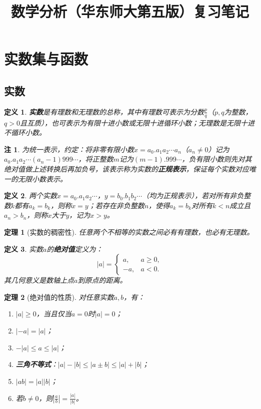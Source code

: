 \documentclass[11pt, a4paper, openany]{article}
\newtheorem{definition}{定义}[section]
\newtheorem{theorem}{定理}[section]
\newtheorem{remark}{注}[section]
\begin{document}
\title{数学分析（华东师大第五版）复习笔记}
\maketitle

\section{实数集与函数}
\subsection{实数}
\begin{definition}
\textbf{实数}是有理数和无理数的总称，其中有理数可表示为分数$\frac{p}{q}$（$p,q$为整数，$q>0$且互质），也可表示为有限十进小数或无限十进循环小数；无理数是无限十进不循环小数。
\end{definition}

\begin{remark}
为统一表示，约定：将非零有限小数$x=a_0.a_1a_2\cdots a_n$（$a_n\neq0$）记为$a_0.a_1a_2\cdots(a_n-1)999\cdots$，将正整数$m$记为$(m-1).999\cdots$，负有限小数则先对其绝对值做上述转换后再加负号，该表示称为实数的\textbf{正规表示}，保证每个实数对应唯一的无限小数表示。
\end{remark}

\begin{definition}
两个实数$x=a_0.a_1a_2\cdots$，$y=b_0.b_1b_2\cdots$（均为正规表示），若对所有非负整数$k$都有$a_k=b_k$，则称$x=y$；若存在非负整数$n$，使得$a_k=b_k$对所有$k<n$成立且$a_n>b_n$，则称$x$大于$y$，记为$x>y$。
\end{definition}

\begin{theorem}[实数的稠密性]
任意两个不相等的实数之间必有有理数，也必有无理数。
\end{theorem}

\begin{definition}
实数$a$的\textbf{绝对值}定义为：
$$|a|=\begin{cases}
a, & a\geq0, \\
-a, & a<0.
\end{cases}$$
其几何意义是数轴上点$a$到原点的距离。
\end{definition}

\begin{theorem}[绝对值的性质]
对任意实数$a,b$，有：
\begin{enumerate}
    \item $|a|\geq0$，当且仅当$a=0$时$|a|=0$；
    \item $|-a|=|a|$；
    \item $-|a|\leq a\leq|a|$；
    \item \textbf{三角不等式}：$|a|-|b|\leq|a\pm b|\leq|a|+|b|$；
    \item $|ab|=|a||b|$；
    \item 若$b\neq0$，则$\left|\frac{a}{b}\right|=\frac{|a|}{|b|}$。
\end{enumerate}
\end{theorem}
\end{document}
